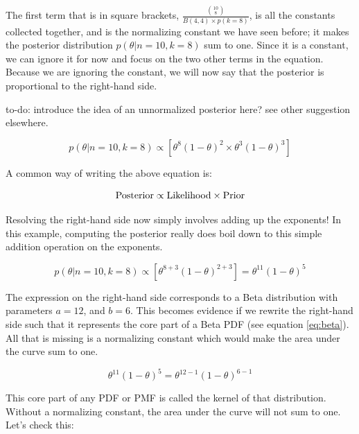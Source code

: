 \documentclass[12pt,]{krantz}
\makeatletter
\newenvironment{kframe}{%
\medskip{}
\setlength{\fboxsep}{.8em}
 \def\at@end@of@kframe{}%
 \ifinner\ifhmode%
  \def\at@end@of@kframe{\end{minipage}}%
  \begin{minipage}{\columnwidth}%
 \fi\fi%
 \def\FrameCommand##1{\hskip\@totalleftmargin \hskip-\fboxsep
 \colorbox{shadecolor}{##1}\hskip-\fboxsep
     \hskip-\linewidth \hskip-\@totalleftmargin \hskip\columnwidth}%
 \MakeFramed {\advance\hsize-\width
   \@totalleftmargin\z@ \linewidth\hsize
   \@setminipage}}%
 {\par\unskip\endMakeFramed%
 \at@end@of@kframe}
\newenvironment{rmdblock}[1]
  {
  \begin{itemize}
  \renewcommand{\labelitemi}{
    \raisebox{-.7\height}[0pt][0pt]{
      {\setkeys{Gin}{width=3em,keepaspectratio}\texttt{[image: images/\#1]}}
    }
  }
  \setlength{\fboxsep}{1em}
  \begin{kframe}
  \item
  }
  {
  \end{kframe}
  \end{itemize}
  }
\newenvironment{rmdnote}
  {\begin{rmdblock}{note}}
  {\end{rmdblock}}
\theoremstyle{definition}
\theoremstyle{definition}
\theoremstyle{definition}
\theoremstyle{remark}
\makeatother
\begin{document}
The first term that is in square brackets,
\(\frac{\binom{10}{8}}{B(4,4)\times p(k=8)}\), is all the constants
collected together, and is the normalizing constant we have seen before;
it makes the posterior distribution \(p(\theta|n=10,k=8)\) sum to one.
Since it is a constant, we can ignore it for now and focus on the two
other terms in the equation. Because we are ignoring the constant, we
will now say that the posterior is proportional to the right-hand side.

\begin{rmdnote} to-do: introduce the idea of an unnormalized
posterior here? see other suggestion elsewhere. \end{rmdnote}

\begin{equation}
p(\theta|n=10,k=8) \propto   [\theta^8 (1-\theta)^{2} \times \theta^{3} (1-\theta)^{3} ]
\label{eq:betaunpost3}
\end{equation}

A common way of writing the above equation is:

\begin{equation}
\hbox{Posterior} \propto \hbox{Likelihood} \times \hbox{Prior}
\end{equation}

Resolving the right-hand side now simply involves adding up the
exponents! In this example, computing the posterior really does boil
down to this simple addition operation on the exponents.

\begin{equation}
p(\theta|n=10,k=8) \propto   [\theta^{8+3} (1-\theta)^{2+3}] = \theta^{11} (1-\theta)^{5}
\label{eq:betaunpost4}
\end{equation}

The expression on the right-hand side corresponds to a Beta distribution
with parameters \(a=12\), and \(b=6\). This becomes evidence if we
rewrite the right-hand side such that it represents the core part of a
Beta PDF (see equation \eqref{eq:beta}). All that is missing is a
normalizing constant which would make the area under the curve sum to
one.

\begin{equation}
\theta^{11} (1-\theta)^{5} = \theta^{12-1} (1-\theta)^{6-1} 
\end{equation}

This core part of any PDF or PMF is called the kernel of that
distribution. Without a normalizing constant, the area under the curve
will not sum to one. Let's check this:
\end{document}
